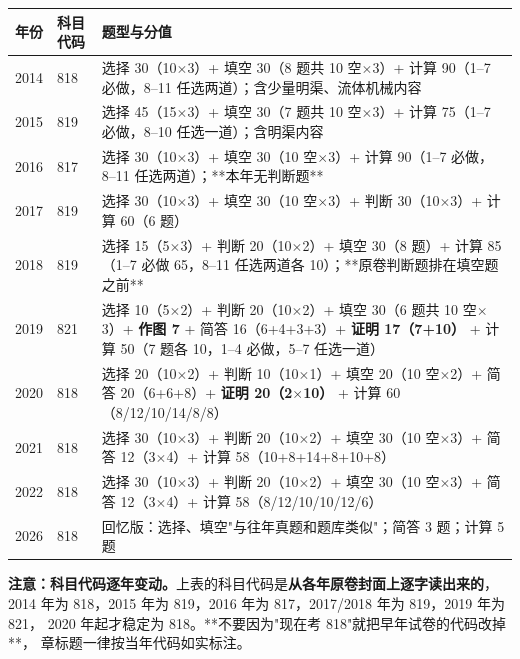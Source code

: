 \begin{center}
\begin{tabularx}{\textwidth}{@{}clX@{}}
\toprule
年份 & 科目代码 & 题型与分值 \\
\midrule
2014 & 818 & 选择 30（10$\times$3）+ 填空 30（8 题共 10 空$\times$3）+ 计算 90（1--7 必做，8--11 任选两道）；含少量明渠、流体机械内容 \\
2015 & 819 & 选择 45（15$\times$3）+ 填空 30（7 题共 10 空$\times$3）+ 计算 75（1--7 必做，8--10 任选一道）；含明渠内容 \\
2016 & 817 & 选择 30（10$\times$3）+ 填空 30（10 空$\times$3）+ 计算 90（1--7 必做，8--11 任选两道）；**本年无判断题** \\
2017 & 819 & 选择 30（10$\times$3）+ 填空 30（10 空$\times$3）+ 判断 30（10$\times$3）+ 计算 60（6 题） \\
2018 & 819 & 选择 15（5$\times$3）+ 判断 20（10$\times$2）+ 填空 30（8 题）+ 计算 85（1--7 必做 65，8--11 任选两道各 10）；**原卷判断题排在填空题之前** \\
2019 & 821 & 选择 10（5$\times$2）+ 判断 20（10$\times$2）+ 填空 30（6 题共 10 空$\times$3）+ \textbf{作图 7} + 简答 16（6+4+3+3）+ \textbf{证明 17（7+10）} + 计算 50（7 题各 10，1--4 必做，5--7 任选一道） \\
2020 & 818 & 选择 20（10$\times$2）+ 判断 10（10$\times$1）+ 填空 20（10 空$\times$2）+ 简答 20（6+6+8）+ \textbf{证明 20（2$\times$10）} + 计算 60（8/12/10/14/8/8） \\
2021 & 818 & 选择 30（10$\times$3）+ 判断 20（10$\times$2）+ 填空 30（10 空$\times$3）+ 简答 12（3$\times$4）+ 计算 58（10+8+14+8+10+8） \\
2022 & 818 & 选择 30（10$\times$3）+ 判断 20（10$\times$2）+ 填空 30（10 空$\times$3）+ 简答 12（3$\times$4）+ 计算 58（8/12/10/10/12/6） \\
2026 & 818 & 回忆版：选择、填空"与往年真题和题库类似"；简答 3 题；计算 5 题 \\
\bottomrule
\end{tabularx}
\end{center}

\noindent\textbf{注意：科目代码逐年变动。}上表的科目代码是\textbf{从各年原卷封面上逐字读出来的}，
2014 年为 818，2015 年为 819，2016 年为 817，2017/2018 年为 819，2019 年为 821，
2020 年起才稳定为 818。**不要因为"现在考 818"就把早年试卷的代码改掉**，
章标题一律按当年代码如实标注。

